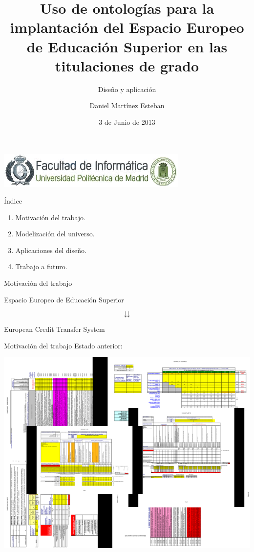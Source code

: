 \documentclass{beamer}
\title[Ontologías y EEES]{Uso de ontologías para la implantación del Espacio Europeo de Educación Superior en las titulaciones de grado}
\subtitle[Diseño y aplicación]{Diseño y aplicación}
\author{Daniel Martínez Esteban}
\institute[FI-UPM]{
	Facultad de Informática\\
	Universidad Politécnica de Madrid\\
}
\date[Junio 2013]{3 de Junio de 2013}
\begin{document}
\begin{frame}[plain]
	\begin{center}
		\includegraphics[scale=0.9]{logofi.png}
	\end{center}
	\titlepage
\end{frame}

\begin{frame}{Índice}
\begin{LARGE}
	\begin{enumerate}
		\item Motivación del trabajo.
		\item Modelización del universo.
		\item Aplicaciones del diseño.
		\item Trabajo a futuro.
	\end{enumerate}
\end{LARGE}
\end{frame}

\begin{frame}{Motivación del trabajo}
	\begin{huge}
		Espacio	Europeo de Educación Superior
	\end{huge}
	\begin{Huge}
	\[
		\downdownarrows 
	\]
	\end{Huge}
	\begin{huge}
		European Credit Transfer System
	\end{huge}
\end{frame}

\begin{frame}{Motivación del trabajo}
	Estado anterior:
	\begin{center}
		\includegraphics[width=1\textwidth]{collage.png}
	\end{center}
\end{frame}
\end{document}
